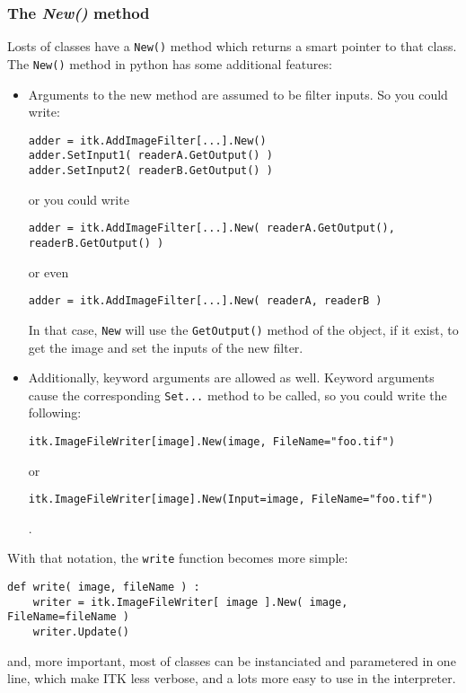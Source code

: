 \documentclass{InsightArticle}
\begin{document}
     \subsubsection{The {\em New()} method}

Losts of classes have a \verb$New()$ method which returns a smart pointer to that class. The
\verb$New()$ method in python has some additional features:
\begin{itemize}
  \item Arguments to the new method are assumed to be filter inputs. So you could
write:
\begin{verbatim}
adder = itk.AddImageFilter[...].New()
adder.SetInput1( readerA.GetOutput() )
adder.SetInput2( readerB.GetOutput() )
\end{verbatim}
or you could write
\begin{verbatim}
adder = itk.AddImageFilter[...].New( readerA.GetOutput(), readerB.GetOutput() )
\end{verbatim}
or even
\begin{verbatim}
adder = itk.AddImageFilter[...].New( readerA, readerB )
\end{verbatim}
In that case, \verb$New$ will use the \verb$GetOutput()$ method of the object, if it
exist, to get the image and set the inputs of the new filter.

  \item Additionally, keyword arguments are allowed as well. Keyword arguments cause
the corresponding \verb$Set...$ method to be called, so you could write the
following:
\begin{verbatim}
itk.ImageFileWriter[image].New(image, FileName="foo.tif")
\end{verbatim}
or
\begin{verbatim}
itk.ImageFileWriter[image].New(Input=image, FileName="foo.tif")
\end{verbatim}.

\end{itemize}

With that notation, the \verb$write$ function becomes more simple:
\begin{verbatim}
def write( image, fileName ) :
    writer = itk.ImageFileWriter[ image ].New( image, FileName=fileName )
    writer.Update()
\end{verbatim}

and, more important, most of classes can be instanciated and parametered in one line,
which make ITK less verbose, and a lots more easy to use in the interpreter.
\end{document}
